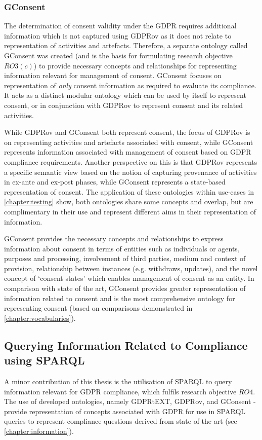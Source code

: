 \subsubsection{GConsent}
The determination of consent validity under the GDPR requires additional information \cite{politou_forgetting_2018,article_29_data_protection_working_party_guidelines_2018} which is not captured using GDPRov as it does not relate to representation of activities and artefacts.
Therefore, a separate ontology called GConsent was created (and is the basis for formulating research objective $RO3(c)$) to provide necessary concepts and relationships for representing information relevant for management of consent.
GConsent focuses on representation of \textit{only} consent information as required to evaluate its compliance. It acts as a distinct modular ontology which can be used by itself to represent consent, or in conjunction with GDPRov to represent consent and its related activities.

While GDPRov and GConsent both represent consent, the focus of GDPRov is on representing activities and artefacts associated with consent, while GConsent represents information associated with management of consent based on GDPR compliance requirements.
Another perspective on this is that GDPRov represents a specific semantic view based on the notion of capturing provenance of activities in ex-ante and ex-post phases, while GConsent represents a state-based representation of consent.
The application of these ontologies within use-cases in \autoref{chapter:testing} show, both ontologies share some concepts and overlap, but are complimentary in their use and represent different aims in their representation of information.

GConsent provides the necessary concepts and relationships to express information about consent in terms of entities such as individuals or agents, purposes and processing, involvement of third parties, medium and context of provision, relationship between instances (e.g. withdraws, updates), and the novel concept of `consent states' which enables management of consent as an entity. 
In comparison with state of the art, GConsent provides greater representation of information related to consent and is the most comprehensive ontology for representing consent (based on comparisons demonstrated in \autoref{chapter:vocabularies}).

\subsection{Querying Information Related to Compliance using SPARQL}\label{sec:contributions:querying}
A minor contribution of this thesis is the utilisation of SPARQL to query information relevant for GDPR compliance, which fulfils research objective $RO4$.
The use of developed ontologies, namely GDPRtEXT, GDPRov, and GConsent - provide representation of concepts associated with GDPR for use in SPARQL queries to represent compliance questions derived from state of the art (see \autoref{chapter:information}).

